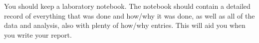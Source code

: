 \documentclass{../lab}
\begin{document}








You should keep a laboratory notebook. The notebook should contain a detailed record of everything that was done and how/why it was done, as well as all of the data and analysis, also with plenty of how/why entries. This will aid you when you write your report.
\end{document}
